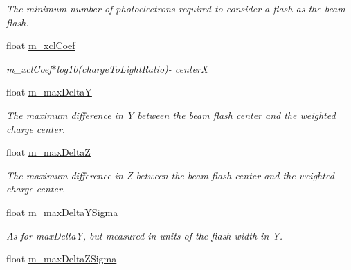 \begin{DoxyCompactItemize}
\begin{DoxyCompactList}\small\item\em The minimum number of photoelectrons required to consider a flash as the beam flash. \end{DoxyCompactList}\item 
float \hyperlink{classflashmatch_1_1FlashMatchingTool_ad4ea54d8957415c895afdd3575dda380}{m\+\_\+xcl\+Coef}\hypertarget{classflashmatch_1_1FlashMatchingTool_ad4ea54d8957415c895afdd3575dda380}{}\label{classflashmatch_1_1FlashMatchingTool_ad4ea54d8957415c895afdd3575dda380}

\begin{DoxyCompactList}\small\item\em m\+\_\+xcl\+Coef$\ast$log10(charge\+To\+Light\+Ratio)-\/ centerX \end{DoxyCompactList}\item 
float \hyperlink{classflashmatch_1_1FlashMatchingTool_a859f9d3405d8f5bae13b3927e193ab91}{m\+\_\+max\+DeltaY}\hypertarget{classflashmatch_1_1FlashMatchingTool_a859f9d3405d8f5bae13b3927e193ab91}{}\label{classflashmatch_1_1FlashMatchingTool_a859f9d3405d8f5bae13b3927e193ab91}

\begin{DoxyCompactList}\small\item\em The maximum difference in Y between the beam flash center and the weighted charge center. \end{DoxyCompactList}\item 
float \hyperlink{classflashmatch_1_1FlashMatchingTool_a8b66b2458157a6216b83200359b6bb17}{m\+\_\+max\+DeltaZ}\hypertarget{classflashmatch_1_1FlashMatchingTool_a8b66b2458157a6216b83200359b6bb17}{}\label{classflashmatch_1_1FlashMatchingTool_a8b66b2458157a6216b83200359b6bb17}

\begin{DoxyCompactList}\small\item\em The maximum difference in Z between the beam flash center and the weighted charge center. \end{DoxyCompactList}\item 
float \hyperlink{classflashmatch_1_1FlashMatchingTool_a255b27c95bb3d2954482e3fdc8cf3e79}{m\+\_\+max\+Delta\+Y\+Sigma}\hypertarget{classflashmatch_1_1FlashMatchingTool_a255b27c95bb3d2954482e3fdc8cf3e79}{}\label{classflashmatch_1_1FlashMatchingTool_a255b27c95bb3d2954482e3fdc8cf3e79}

\begin{DoxyCompactList}\small\item\em As for max\+DeltaY, but measured in units of the flash width in Y. \end{DoxyCompactList}\item 
float \hyperlink{classflashmatch_1_1FlashMatchingTool_aa5460134c0dbb87c67ca199a0ddb67ac}{m\+\_\+max\+Delta\+Z\+Sigma}\hypertarget{classflashmatch_1_1FlashMatchingTool_aa5460134c0dbb87c67ca199a0ddb67ac}{}\label{classflashmatch_1_1FlashMatchingTool_aa5460134c0dbb87c67ca199a0ddb67ac}


\end{DoxyCompactItemize}
